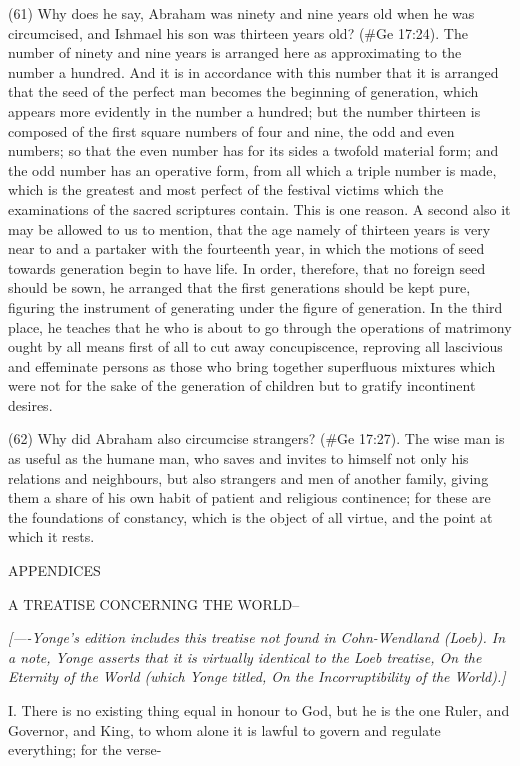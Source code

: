 (61) Why does he say, Abraham was ninety and nine years old when he was circumcised, and
Ishmael his son was thirteen years old? (\#Ge 17:24). The number of ninety and nine years is
arranged here as approximating to the number a hundred. And it is in accordance with this number
that it is arranged that the seed of the perfect man becomes the beginning of generation, which
appears more evidently in the number a hundred; but the number thirteen is composed of the first
square numbers of four and nine, the odd and even numbers; so that the even number has for its
sides a twofold material form; and the odd number has an operative form, from all which a triple
number is made, which is the greatest and most perfect of the festival victims which the
examinations of the sacred scriptures contain. This is one reason. A second also it may be
allowed to us to mention, that the age namely of thirteen years is very near to and a partaker with
the fourteenth year, in which the motions of seed towards generation begin to have life. In order,
therefore, that no foreign seed should be sown, he arranged that the first generations should be
kept pure, figuring the instrument of generating under the figure of generation. In the third place, he
teaches that he who is about to go through the operations of matrimony ought by all means first of
all to cut away concupiscence, reproving all lascivious and effeminate persons as those who bring
together superfluous mixtures which were not for the sake of the generation of children but to
gratify incontinent desires.

(62) Why did Abraham also circumcise strangers? (\#Ge 17:27). The wise man is as useful as
the humane man, who saves and invites to himself not only his relations and neighbours, but also
strangers and men of another family, giving them a share of his own habit of patient and religious
continence; for these are the foundations of constancy, which is the object of all virtue, and the
point at which it rests.


APPENDICES

A TREATISE CONCERNING THE WORLD--

\emph{[----Yonge's edition includes this treatise not found in Cohn-Wendland (Loeb). In a note, Yonge asserts that it is virtually
identical to the Loeb treatise, On the Eternity of the World (which Yonge titled, On the Incorruptibility of the World).]}

I. There is no existing thing equal in honour to God, but he is the one Ruler, and Governor, and
King, to whom alone it is lawful to govern and regulate everything; for the verse-

